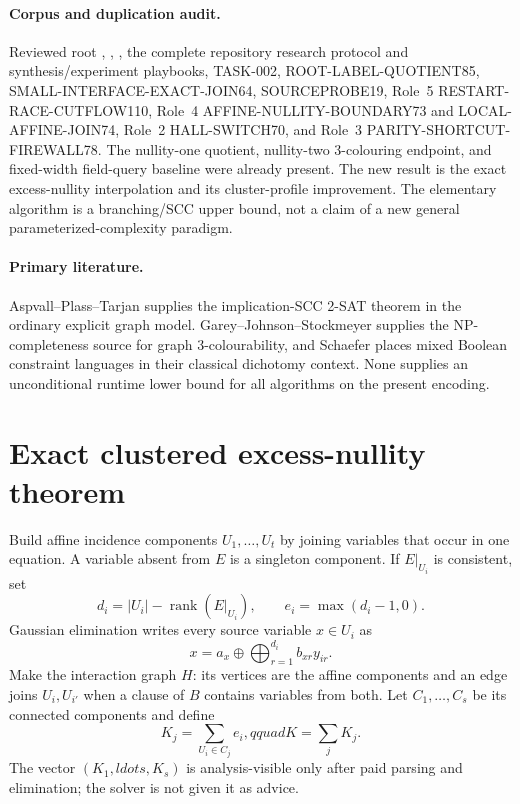\documentclass[11pt]{article}
\begin{document}
\paragraph{Corpus and duplication audit.}
Reviewed root , , , the complete
repository research protocol and synthesis/experiment playbooks, TASK-002,
ROOT-LABEL-QUOTIENT85, SMALL-INTERFACE-EXACT-JOIN64, SOURCEPROBE19,
Role~5 RESTART-RACE-CUTFLOW110, Role~4 AFFINE-NULLITY-BOUNDARY73 and
LOCAL-AFFINE-JOIN74, Role~2 HALL-SWITCH70, and Role~3
PARITY-SHORTCUT-FIREWALL78.  The nullity-one quotient, nullity-two
3-colouring endpoint, and fixed-width field-query baseline were already
present.  The new result is the exact excess-nullity interpolation and its
cluster-profile improvement.  The elementary algorithm is a branching/SCC
upper bound, not a claim of a new general parameterized-complexity paradigm.

\paragraph{Primary literature.}
Aspvall--Plass--Tarjan supplies the implication-SCC 2-SAT theorem in the
ordinary explicit graph model.  Garey--Johnson--Stockmeyer supplies the
NP-completeness source for graph 3-colourability, and Schaefer places mixed
Boolean constraint languages in their classical dichotomy context.
None supplies an unconditional runtime lower bound for all algorithms on
the present encoding.

\section{Exact clustered excess-nullity theorem}
Build affine incidence components $U_1,\ldots,U_t$ by joining variables that
occur in one equation.  A variable absent from $E$ is a singleton component.
If $E|_{U_i}$ is consistent, set
\[
d_i=|U_i|-\operatorname{rank}(E|_{U_i}),\qquad
e_i=\max(d_i-1,0).                                                   \tag{2}
\]
Gaussian elimination writes every source variable $x\in U_i$ as
\[
x=a_x\oplus\bigoplus_{r=1}^{d_i}b_{xr}y_{ir}.                       \tag{3}
\]
Make the interaction graph $H$: its vertices are the affine components and
an edge joins $U_i,U_{i'}$ when a clause of $B$ contains variables from both.
Let $C_1,\ldots,C_s$ be its connected components and define
\[
K_j=\sum_{U_i\in C_j}e_i,qquad K=\sum_jK_j.                         \tag{4}
\]
The vector $(K_1,ldots,K_s)$ is analysis-visible only after paid parsing and
elimination; the solver is not given it as advice.
\end{document}
